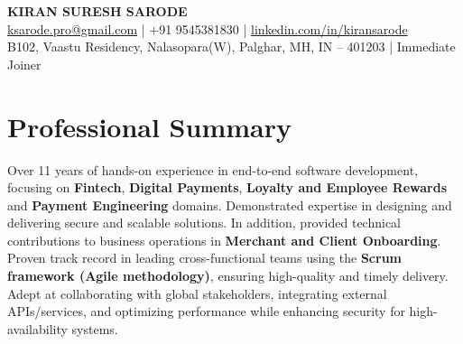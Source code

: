 \documentclass[12pt,a4paper]{article}
\begin{document}
\begin{center}
    {\Large \textbf{KIRAN SURESH SARODE}}\\
    \vspace{2pt}
    \href{mailto:ksarode.pro@gmail.com}{ksarode.pro@gmail.com} \quad | \quad +91 9545381830 \quad | \quad 
    \href{https://www.linkedin.com/in/kiransarode}{linkedin.com/in/kiransarode}\\
    \vspace{1pt}
    \footnotesize
    B102, Vaastu Residency, Nalasopara(W), Palghar, MH, IN -- 401203 \quad | \quad Immediate Joiner
\end{center}

\section*{Professional Summary}
Over 11 years of hands-on experience in end-to-end software development, focusing on \textbf{Fintech}, \textbf{Digital Payments}, \textbf{Loyalty and Employee Rewards} and \textbf{Payment Engineering} domains. Demonstrated expertise in designing and delivering secure and scalable solutions. In addition, provided technical contributions to business operations in \textbf{Merchant and Client Onboarding}. Proven track record in leading cross-functional teams using the \textbf{Scrum framework (Agile methodology)}, ensuring high-quality and timely delivery. Adept at collaborating with global stakeholders, integrating external APIs/services, and optimizing performance while enhancing security for high-availability systems.

\end{document}
